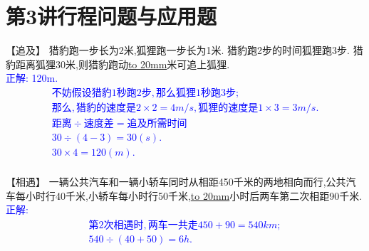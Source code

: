 \section{第3讲\quad 行程问题与应用题}

\item {
    【追及】
    猎豹跑一步长为2米,狐狸跑一步长为1米. 猎豹跑2步的时间狐狸跑3步. 猎豹距离狐狸30米,则猎豹跑动\underline{\hbox to 20mm{}}米可追上狐狸. 
    \ifshowSolution 
        \fangsong{}\textcolor{blue}{
            \\正解: 120m.\\
            \begin{gather*}
                不妨假设猎豹1秒跑2步,那么狐狸1秒跑3步;\\
                那么,猎豹的速度是 2\times 2 = 4m/s, 狐狸的速度是 1\times 3 = 3 m/s. \\
                距离\div 速度差 = 追及所需时间\\
                30\div (4-3) = 30(s). \\
                30 \times 4 = 120 (m).\\
            \end{gather*}
        }
    \else
        \vspace{2cm}
    \fi
}

\item {
    【相遇】
    一辆公共汽车和一辆小轿车同时从相距450千米的两地相向而行,公共汽车每小时行40千米,小轿车每小时行50千米,\underline{\hbox to 20mm{}}小时后两车第二次相距90千米. 
    \ifshowSolution 
        \fangsong{}\textcolor{blue}{
            \\正解: \\
            \begin{gather*}
                第2次相遇时,两车一共走 450+90=540 km;\\
                540\div (40+50) = 6h.\\
            \end{gather*}
        }
    \else
        \vspace{2cm}
    \fi
}


